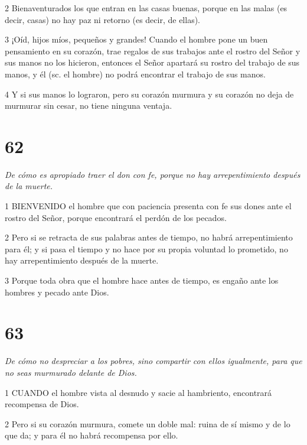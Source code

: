 \par 2 Bienaventurados los que entran en las casas buenas, porque en las malas (es decir, casas) no hay paz ni retorno (es decir, de ellas).

\par 3 ¡Oíd, hijos míos, pequeños y grandes! Cuando el hombre pone un buen pensamiento en su corazón, trae regalos de sus trabajos ante el rostro del Señor y sus manos no los hicieron, entonces el Señor apartará su rostro del trabajo de sus manos, y él (sc. el hombre) no podrá encontrar el trabajo de sus manos.

\par 4 Y si sus manos lo lograron, pero su corazón murmura y su corazón no deja de murmurar sin cesar, no tiene ninguna ventaja.

\chapter{62}

\par \textit{De cómo es apropiado traer el don con fe, porque no hay arrepentimiento después de la muerte.}

\par 1 BIENVENIDO el hombre que con paciencia presenta con fe sus dones ante el rostro del Señor, porque encontrará el perdón de los pecados.

\par 2 Pero si se retracta de sus palabras antes de tiempo, no habrá arrepentimiento para él; y si pasa el tiempo y no hace por su propia voluntad lo prometido, no hay arrepentimiento después de la muerte.

\par 3 Porque toda obra que el hombre hace antes de tiempo, es engaño ante los hombres y pecado ante Dios.



\chapter{63}

\par \textit{De cómo no despreciar a los pobres, sino compartir con ellos igualmente, para que no seas murmurado delante de Dios.}

\par 1 CUANDO el hombre vista al desnudo y sacie al hambriento, encontrará recompensa de Dios.

\par 2 Pero si su corazón murmura, comete un doble mal: ruina de sí mismo y de lo que da; y para él no habrá recompensa por ello.

